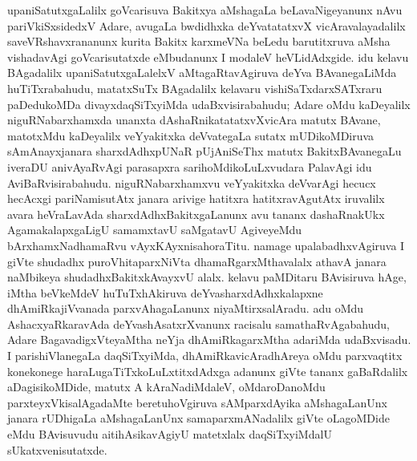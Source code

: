 upaniSatutxgaLalilx goVcarisuva Bakitxya aMshagaLa beLavaNigeyanunx nAvu pariV\-kiSxsidedxV Adare, avugaLa bwdidhxka deYvatatatxvX vicAravalayadalilx saveVRshavxrananunx kurita Bakitx karxmeVNa beLedu barutitxruva aMsha vishadavAgi goVcarisutatxde eMbudanunx I modaleV heVLidAdxgide. idu kelavu BAgadalilx upaniSatutxgaLalelxV aMtagaRtavAgiruva deYva BAvanegaLiMda huTiTxrabahudu, matatxSuTx BAgadalilx kelavaru vishiSaTxdarxSATxraru paDedukoMDa divayxdaqSiTxyiMda udaBxvisirabahudu; Adare oMdu kaDeyalilx niguRNabarxhamxda unanxta dAshaRnikatatatxvXvicAra matutx BAvane, matotxMdu kaDeyalilx veYyakitxka deVvategaLa sutatx mUDikoMDiruva sAmAnayxjanara sharxdAdhxpUNaR pUjAniSeThx matutx BakitxBAvanegaLu iveraDU anivAyaRvAgi parasapxra sarihoMdikoLuLxvudara PalavAgi idu AviBaRvisirabahudu. niguRNabarxhamxvu veYyakitxka deVvarAgi hecucx hecAcxgi pariNamisutAtx janara arivige hatitxra hatitxravAgutAtx iruvalilx avara heVraLavAda sharxdAdhxBakitxgaLanunx avu tananx dashaRnakUkx AgamakalapxgaLigU samamxtavU saMgatavU AgiveyeMdu bArxhamxNadhamaRvu vAyxKAyxnisahoraTitu. namage upalabadhxvAgiruva I giVte shudadhx puroVhitaparxNiVta dhamaRgarxMthavalalx athavA janara naMbikeya shudadhxBakitxkAvayxvU alalx. kelavu paMDitaru BAvisiruva hAge, iMtha beVkeMdeV huTuTxhAkiruva deYvasharxdAdhxkalapxne dhAmiRkajiVvanada parxvAhagaLanunx niyaMtirxsalAradu. adu oMdu AshacxyaRkaravAda deYvashAsatxrXvanunx racisalu samathaRvAgabahudu, Adare BagavadigxVteyaMtha neYja dhAmiRkagarxMtha adariMda udaBxvisadu. I parishiVlanegaLa daqSiTxyiMda, dhAmiRkavicAradhAreya oMdu parxvaqtitx konekonege haraLugaTiTxkoLuLxtitxdAdxga adanunx giVte tananx gaBaRdalilx aDagisikoMDide, matutx A kAraNadiMdaleV, oMdaroDanoMdu parxteyxVkisalAgadaMte beretuhoVgiruva sAMparxdAyika aMshagaLanUnx janara rUDhigaLa aMshagaLanUnx samaparxmANadalilx giVte oLagoMDide eMdu BAvisuvudu aitihAsikavAgiyU matetxlalx daqSiTxyiMdalU sUkatxvenisutatxde.

